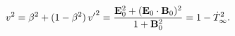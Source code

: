 \begin{equation}
v^2 = \beta^2 + (1-\beta^2)\,{v'}^2=
\frac{{\bf E}_0^2 + ({\bf E}_0 \cdot  {\bf B}_0)^2}{1+{\bf B}_0^2}
= 1-\dot T_\infty^2.
\end{equation}

